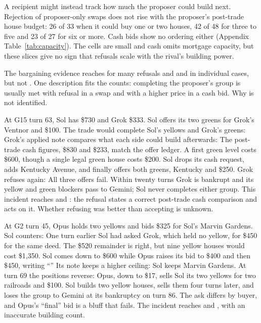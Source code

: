 A recipient might instead track how much the proposer could build next. Rejection of proposer-only swaps does not rise with the proposer's post-trade house budget: 26 of 33 when it could buy one or two houses, 42 of 48 for three to five and 23 of 27 for six or more. Cash bids show no ordering either (Appendix Table~\ref{tab:capacity}). The cells are small and cash omits mortgage capacity, but these slices give no sign that refusals scale with the rival's building power.

The bargaining evidence reaches  for many refusals and  and  in individual cases, but not . One description fits the counts: completing the proposer's group is usually met with refusal in a swap and with a higher price in a cash bid. Why is not identified.

At G15 turn 63, Sol has \$730 and Grok \$333. Sol offers its two greens for Grok's Ventnor and \$100. The trade would complete Sol's yellows and Grok's greens:
Grok's applied note compares what each side could build afterwards:
The post-trade cash figures, \$830 and \$233, match the offer ledger. A first green level costs \$600, though a single legal green house costs \$200. Sol drops its cash request, adds Kentucky Avenue, and finally offers both greens, Kentucky and \$250. Grok refuses again:
All three offers fail. Within twenty turns Grok is bankrupt and its yellow and green blockers pass to Gemini; Sol never completes either group. This incident reaches  and : the refusal states a correct post-trade cash comparison and acts on it. Whether refusing was better than accepting is unknown.

At G2 turn 45, Opus holds two yellows and bids \$325 for Sol's Marvin Gardens. Sol counters:
One turn earlier Sol had asked Grok, which held no yellow, for \$450 for the same deed. The \$520 remainder is right, but nine yellow houses would cost \$1,350. Sol comes down to \$600 while Opus raises its bid to \$400 and then \$450, writing ``'' Its note keeps a higher ceiling:
Sol keeps Marvin Gardens. At turn 69 the positions reverse: Opus, down to \$17, sells Sol its two yellows for two railroads and \$100. Sol builds two yellow houses, sells them four turns later, and loses the group to Gemini at its bankruptcy on turn 86. The ask differs by buyer, and Opus's ``final'' bid is a bluff that fails. The incident reaches  and , with an inaccurate building count.

